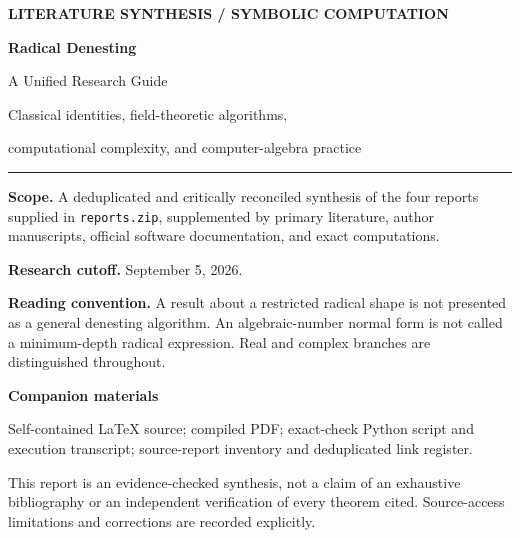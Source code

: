 \documentclass[11pt,letterpaper]{article}
\numberwithin{equation}{section}
\theoremstyle{definition}
\theoremstyle{remark}
\begin{document}
\begin{titlepage}
\thispagestyle{empty}
\vspace*{0.5in}
{\small\sffamily\bfseries\color{ruleblue} LITERATURE SYNTHESIS \quad / \quad SYMBOLIC COMPUTATION}\par
\vspace{0.45in}
{\Huge\bfseries Radical Denesting\par}
\vspace{0.14in}
{\LARGE A Unified Research Guide\par}
\vspace{0.3in}
{\large Classical identities, field-theoretic algorithms,\par computational complexity, and computer-algebra practice\par}
\vspace{0.4in}
\noindent\textcolor{ruleblue}{\rule{\textwidth}{1pt}}
\vspace{0.16in}
\noindent\textbf{Scope.} A deduplicated and critically reconciled synthesis of the four reports supplied in \texttt{reports.zip}, supplemented by primary literature, author manuscripts, official software documentation, and exact computations.\par
\vspace{0.15in}
\noindent\textbf{Research cutoff.} September 5, 2026.\par
\vspace{0.15in}
\noindent\textbf{Reading convention.} A result about a restricted radical shape is not presented as a general denesting algorithm. An algebraic-number normal form is not called a minimum-depth radical expression. Real and complex branches are distinguished throughout.\par
\vfill
\noindent\textbf{Companion materials}\par
\noindent Self-contained LaTeX source; compiled PDF; exact-check Python script and execution transcript; source-report inventory and deduplicated link register.\par
\vspace{0.3in}
{\small This report is an evidence-checked synthesis, not a claim of an exhaustive bibliography or an independent verification of every theorem cited. Source-access limitations and corrections are recorded explicitly.}
\end{titlepage}
\end{document}
